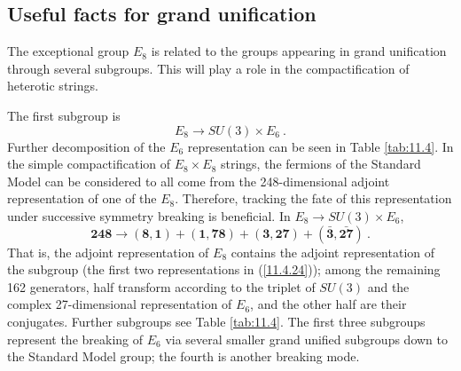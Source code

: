 \subsection*{Useful facts for grand unification}

The exceptional group $E_{8}$ is related to the groups appearing in grand unification through several subgroups. This will play a role in the compactification of heterotic strings. 

The first subgroup is
\begin{equation}
	E_{8} \to SU(3) \times E_{6} \:. \label{11.4.23}
\end{equation}
Further decomposition of the $E_{6}$ representation can be seen in Table \ref{tab:11.4}. In the simple compactification of $E_{8}\times E_{8}$ strings, the fermions of the Standard Model can be considered to all come from the 248-dimensional adjoint representation of one of the $E_{8}$. Therefore, tracking the fate of this representation under successive symmetry breaking is beneficial. In $E_{8}\to SU(3)\times E_{6}$,
\begin{equation}
	\mathbf{248} \to (\mathbf{8},\mathbf{1})+ (\mathbf{1},\mathbf{78})+ (\mathbf{3},\mathbf{27})
	+(\bar{\mathbf{3}},\bar{\mathbf{27}}) \:. \label{11.4.24}
\end{equation}
That is, the adjoint representation of $E_{8}$ contains the adjoint representation of the subgroup (the first two representations in (\ref{11.4.24})); among the remaining 162 generators, half transform according to the triplet of $SU(3)$ and the complex 27-dimensional representation of $E_{6}$, and the other half are their conjugates. Further subgroups see Table \ref{tab:11.4}. The first three subgroups represent the breaking of $E_{6}$ via several smaller grand unified subgroups down to the Standard Model group; the fourth is another breaking mode.

